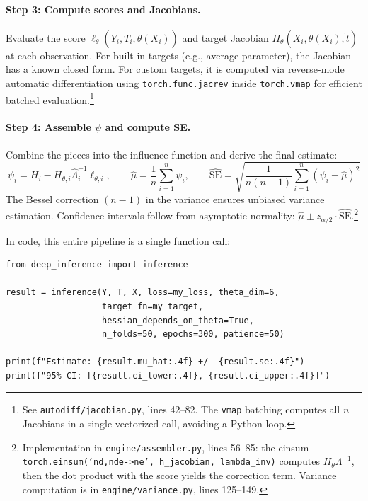 \paragraph{Step 3: Compute scores and Jacobians.} Evaluate the score $\ell_\theta(Y_i, T_i, \hat{\theta}(X_i))$ and target Jacobian $H_\theta(X_i, \hat{\theta}(X_i), \tilde{t})$ at each observation. For built-in targets (e.g., average parameter), the Jacobian has a known closed form. For custom targets, it is computed via reverse-mode automatic differentiation using \texttt{torch.func.jacrev} inside \texttt{torch.vmap} for efficient batched evaluation.\footnote{See \texttt{autodiff/jacobian.py}, lines 42--82. The \texttt{vmap} batching computes all $n$ Jacobians in a single vectorized call, avoiding a Python loop.}

\paragraph{Step 4: Assemble $\psi$ and compute SE.} Combine the pieces into the influence function and derive the final estimate:
\begin{equation}\label{eq:psi_assembly}
    \psi_i = H_i - H_{\theta,i} \hat{\Lambda}_i^{-1} \ell_{\theta,i}, \qquad \hat{\mu} = \frac{1}{n}\sum_{i=1}^n \psi_i, \qquad \widehat{\mathrm{SE}} = \sqrt{\frac{1}{n(n-1)}\sum_{i=1}^n (\psi_i - \hat{\mu})^2}
\end{equation}
The Bessel correction $(n-1)$ in the variance ensures unbiased variance estimation. Confidence intervals follow from asymptotic normality: $\hat{\mu} \pm z_{\alpha/2} \cdot \widehat{\mathrm{SE}}$.\footnote{Implementation in \texttt{engine/assembler.py}, lines 56--85: the einsum \texttt{torch.einsum(`nd,nde->ne', h\_jacobian, lambda\_inv)} computes $H_\theta \Lambda^{-1}$, then the dot product with the score yields the correction term. Variance computation is in \texttt{engine/variance.py}, lines 125--149.}

In code, this entire pipeline is a single function call:

\begin{lstlisting}
from deep_inference import inference

result = inference(Y, T, X, loss=my_loss, theta_dim=6,
                   target_fn=my_target,
                   hessian_depends_on_theta=True,
                   n_folds=50, epochs=300, patience=50)

print(f"Estimate: {result.mu_hat:.4f} +/- {result.se:.4f}")
print(f"95% CI: [{result.ci_lower:.4f}, {result.ci_upper:.4f}]")
\end{lstlisting}

